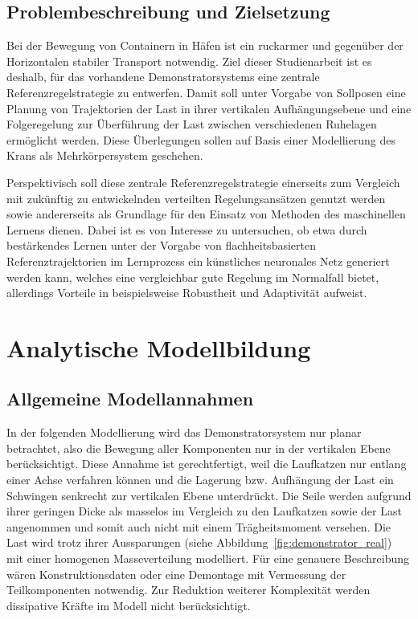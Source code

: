 \section{Problembeschreibung und Zielsetzung}
Bei der Bewegung von Containern in Häfen ist ein ruckarmer und gegenüber der Horizontalen stabiler Transport notwendig. Ziel dieser Studienarbeit ist es deshalb, für das vorhandene Demonstratorsystems eine zentrale Referenzregelstrategie zu entwerfen. Damit soll unter Vorgabe von Sollposen eine Planung von Trajektorien der Last in ihrer vertikalen Aufhängungsebene und eine Folgeregelung zur Überführung der Last zwischen verschiedenen Ruhelagen ermöglicht werden. Diese Überlegungen sollen auf Basis einer Modellierung des Krans als Mehrkörpersystem geschehen. 

Perspektivisch soll diese zentrale Referenzregelstrategie einerseits zum Vergleich mit zukünftig zu entwickelnden verteilten Regelungsansätzen genutzt werden sowie andererseits als Grundlage für den Einsatz von Methoden des maschinellen Lernens dienen. Dabei ist es von Interesse zu untersuchen, ob etwa durch bestärkendes Lernen unter der Vorgabe von flachheitsbasierten Referenztrajektorien im Lernprozess ein künstliches neuronales Netz generiert werden kann, welches eine vergleichbar gute Regelung im Normalfall bietet, allerdings Vorteile in beispielsweise Robustheit und Adaptivität aufweist.

\chapter{Analytische Modellbildung}

\section{Allgemeine Modellannahmen}

In der folgenden Modellierung wird das Demonstratorsystem nur planar betrachtet, also die Bewegung aller Komponenten nur in der vertikalen Ebene berücksichtigt. Diese Annahme ist gerechtfertigt, weil die Laufkatzen nur entlang einer Achse verfahren können und die Lagerung bzw. Aufhängung der Last ein Schwingen senkrecht zur vertikalen Ebene unterdrückt. Die Seile werden aufgrund ihrer geringen Dicke als masselos im Vergleich zu den Laufkatzen sowie der Last angenommen und somit auch nicht mit einem Trägheitsmoment versehen. Die Last wird trotz ihrer Aussparungen (siehe Abbildung~\ref{fig:demonstrator_real}) mit einer homogenen Masseverteilung modelliert. Für eine genauere Beschreibung wären Konstruktionsdaten oder eine Demontage mit Vermessung der Teilkomponenten notwendig. Zur Reduktion weiterer Komplexität werden dissipative Kräfte im Modell nicht berücksichtigt.

